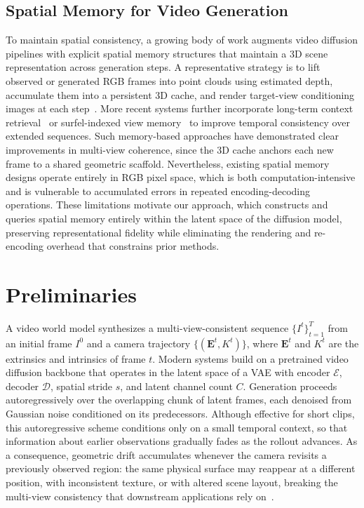 \documentclass{llmxive}
\begin{document}
\subsection{Spatial Memory for Video Generation}
To maintain spatial consistency, a growing body of work augments video diffusion pipelines with explicit spatial memory structures that maintain a 3D scene representation across generation steps. A representative strategy is to lift observed or generated RGB frames into point clouds using estimated depth, accumulate them into a persistent 3D cache, and render target-view conditioning images at each step~\cite{yu2024wonderjourney,engstler2024invisible,yu2024wonderworld,huang2025voyager,zhao2026spatia,chen2025flexworld}. More recent systems further incorporate long-term context retrieval~\cite{yu2025context,xiao2025worldmem} or surfel-indexed view memory~\cite{li2025vmem} to improve temporal consistency over extended sequences. Such memory-based approaches have demonstrated clear improvements in multi-view coherence, since the 3D cache anchors each new frame to a shared geometric scaffold. Nevertheless, existing spatial memory designs operate entirely in RGB pixel space, which is both computation-intensive and is vulnerable to accumulated errors in repeated encoding-decoding operations. These limitations motivate our approach, which constructs and queries spatial memory entirely within the latent space of the diffusion model, preserving representational fidelity while eliminating the rendering and re-encoding overhead that constrains prior methods.

\section{Preliminaries}
\label{sec:prelim}

A video world model synthesizes a multi-view-consistent sequence $\{I^t\}_{t=1}^{T}$ from an initial frame $I^0$ and a camera trajectory $\{(\mathbf{E}^t, K^t)\}$, where $\mathbf{E}^t$ and $K^t$ are the extrinsics and intrinsics of frame $t$.
Modern systems build on a pretrained video diffusion backbone that operates in the latent space of a VAE with encoder $\mathcal{E}$, decoder $\mathcal{D}$, spatial stride $s$, and latent channel count $C$.
Generation proceeds autoregressively over the overlapping chunk of latent frames, each denoised from Gaussian noise conditioned on its predecessors.
Although effective for short clips, this autoregressive scheme conditions only on a small temporal context, so that information about earlier observations gradually fades as the rollout advances.
As a consequence, geometric drift accumulates whenever the camera revisits a previously observed region: the same physical surface may reappear at a different position, with inconsistent texture, or with altered scene layout, breaking the multi-view consistency that downstream applications rely on~\cite{yang2024cogvideox, wan2025wan}.
\end{document}
